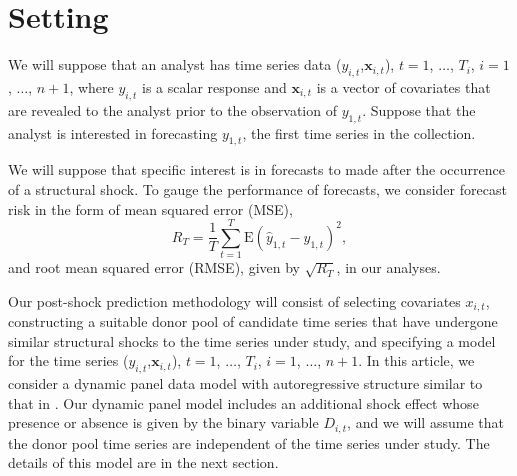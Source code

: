\documentclass[11pt]{article}
\newcommand{\x}{\textbf{x}}
\def\E#1{\mathrm{E}(#1)} %
\theoremstyle{definition}
\begin{document}





\section{Setting}
\label{setting}

We will suppose that an analyst has time series data ($y_{i,t}$,$\x_{i,t}$), $t = 1$, $\ldots$, $T_i$, $i = 1$, $\ldots$, $n+1$, where $y_{i,t}$ is a scalar response and $\x_{i,t}$ is a vector of covariates that are revealed to the analyst prior to the observation of $y_{1,t}$.  Suppose that the analyst is interested in forecasting $y_{1,t}$, the first time series in the collection. 

We will suppose that specific interest is in forecasts to made after the occurrence of a structural shock. To gauge the performance of forecasts, we consider forecast risk in the form of mean squared error (MSE),
$$
  R_T = \frac{1}{T}\sum_{t=1}^T\E{\hat y_{1,t} - y_{1,t}}^2,
$$
and root mean squared error (RMSE), given by $\sqrt{R_T}$, in our analyses. 


Our post-shock prediction methodology will consist of selecting covariates $x_{i,t}$, constructing a suitable donor pool of candidate time series that have undergone similar structural shocks to the time series under study, and specifying a model for the time series ($y_{i,t}$,$\x_{i,t}$), $t = 1$, $\ldots$, $T_i$, $i = 1$, $\ldots$, $n+1$. In this article, we consider a dynamic panel data model with autoregressive structure similar to that in \citet{blundell1998initial}. Our dynamic panel model includes an additional shock effect whose presence or absence is given by the binary variable $D_{i,t}$, and we will assume that the donor pool time series are independent of the time series under study. The details of this model are in the next section.
\end{document}
